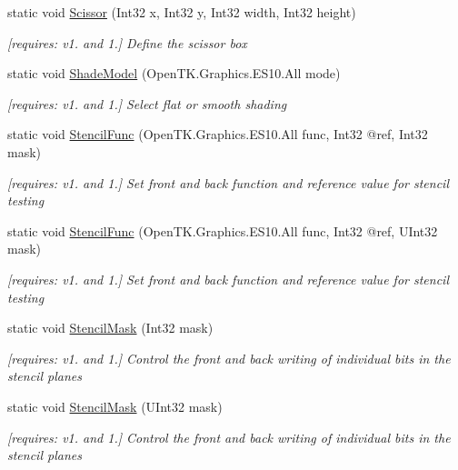\begin{DoxyCompactItemize}
static void \hyperlink{class_open_t_k_1_1_graphics_1_1_e_s10_1_1_g_l_af103bd911e1b87c05d33423bddc5f544}{Scissor} (Int32 x, Int32 y, Int32 width, Int32 height)
\begin{DoxyCompactList}\small\item\em \mbox{[}requires\-: v1. and 1.\mbox{]} Define the scissor box \end{DoxyCompactList}\item 
static void \hyperlink{class_open_t_k_1_1_graphics_1_1_e_s10_1_1_g_l_ab8bf0c2ddf0bf6e08d440b7641d9433e}{Shade\-Model} (Open\-T\-K.\-Graphics.\-E\-S10.\-All mode)
\begin{DoxyCompactList}\small\item\em \mbox{[}requires\-: v1. and 1.\mbox{]} Select flat or smooth shading \end{DoxyCompactList}\item 
static void \hyperlink{class_open_t_k_1_1_graphics_1_1_e_s10_1_1_g_l_aecaf3b4df24b0290d45b81aef70cbd7f}{Stencil\-Func} (Open\-T\-K.\-Graphics.\-E\-S10.\-All func, Int32 @ref, Int32 mask)
\begin{DoxyCompactList}\small\item\em \mbox{[}requires\-: v1. and 1.\mbox{]} Set front and back function and reference value for stencil testing \end{DoxyCompactList}\item 
static void \hyperlink{class_open_t_k_1_1_graphics_1_1_e_s10_1_1_g_l_a2d52978e9cf023d9b853007682319d83}{Stencil\-Func} (Open\-T\-K.\-Graphics.\-E\-S10.\-All func, Int32 @ref, U\-Int32 mask)
\begin{DoxyCompactList}\small\item\em \mbox{[}requires\-: v1. and 1.\mbox{]} Set front and back function and reference value for stencil testing \end{DoxyCompactList}\item 
static void \hyperlink{class_open_t_k_1_1_graphics_1_1_e_s10_1_1_g_l_a4d949ed293e7c46d7b608e0895c2728a}{Stencil\-Mask} (Int32 mask)
\begin{DoxyCompactList}\small\item\em \mbox{[}requires\-: v1. and 1.\mbox{]} Control the front and back writing of individual bits in the stencil planes \end{DoxyCompactList}\item 
static void \hyperlink{class_open_t_k_1_1_graphics_1_1_e_s10_1_1_g_l_af46b83f114bc1329d1017604ccd26c7b}{Stencil\-Mask} (U\-Int32 mask)
\begin{DoxyCompactList}\small\item\em \mbox{[}requires\-: v1. and 1.\mbox{]} Control the front and back writing of individual bits in the stencil planes \end{DoxyCompactList}\item 

\end{DoxyCompactItemize}
